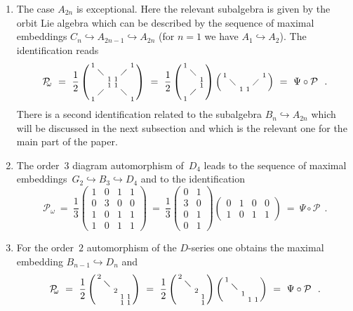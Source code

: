 \documentclass[12pt,a4paper]{article}
\newcommand{\proj}{\mc{P}_{\!\!\omega}}
\newcommand{\embin}{{\hookrightarrow}}
\newcommand{\smat}{\begin{smallmatrix}}
\newcommand{\stam}{\end{smallmatrix}}
\newcommand{\mc}{\mathcal} %
\def\Iso{\Psi}
\begin{document}
\begin{appendix}
\begin{enumerate}
\item The case $A_{2n}$ is exceptional. Here the relevant subalgebra
  is given by the orbit Lie algebra which can be described by the sequence
  of maximal embeddings $C_n\embin A_{2n-1}\embin A_{2n}$
  (for $n=1$ we have $A_1\embin A_2$). The identification reads
\[
  \proj
  \ =\ \frac{1}{2}\left(\smat1&&&&&1\\&\diagdown&&&\diagup
 \\&&1&1&&\\&&1&1&&\\&\diagup&&&\diagdown\\1&&&&&1\stam\right)
  \ =\ \frac{1}{2}\left(\smat1&\\&\diagdown\\&&1\\&&1\\&\diagup
  \\1\stam\right)\left(\smat1&&&&&1\\&\diagdown&&&\diagup\\&&1&1\stam\right)
  \ =\ \Iso\circ\mc{P}\ \ .
\]
  There is a second identification related to the subalgebra
  $B_n\embin A_{2n}$ which will be discussed in the next
  subsection and which is the relevant one for the main part of the paper.

\item The order~$3$ diagram automorphism of~$D_4$ leads to the sequence
  of maximal embeddings~$G_2\embin B_3\embin D_4$ and to the
  identification
\[
  \proj
  \ =\ \frac{1}{3}\left(\smat1&0&1&1\\0&3&0&0\\1&0&1&1\\1&0&1&1\stam\right)
  \ =\ \frac{1}{3}\left(\smat0&1\\3&0\\0&1\\0&1\stam\right)\left(\smat0&1&0&0\\1&0&1&1\stam\right)
  \ =\ \Iso\circ\mc{P}\ \ .
\]

\item For the order~$2$ automorphism of the $D$-series one obtains the
  maximal embedding $B_{n-1}\embin D_{n}$ and
\[
  \proj
  \ =\ \frac{1}{2}\left(\smat2\\&\diagdown\\&&2\\&&&1&1\\&&&1&1\stam\right)
  \ =\ \frac{1}{2}\left(\smat2&\\&\diagdown\\&&2\\&&&1\\&&&1\stam\right)
  \left(\smat1\\&\diagdown&\\&&1\\&&&1&1\stam\right)
  \ =\ \Iso\circ\mc{P}\ \ .
\]


\end{enumerate}
\end{appendix}
\end{document}
